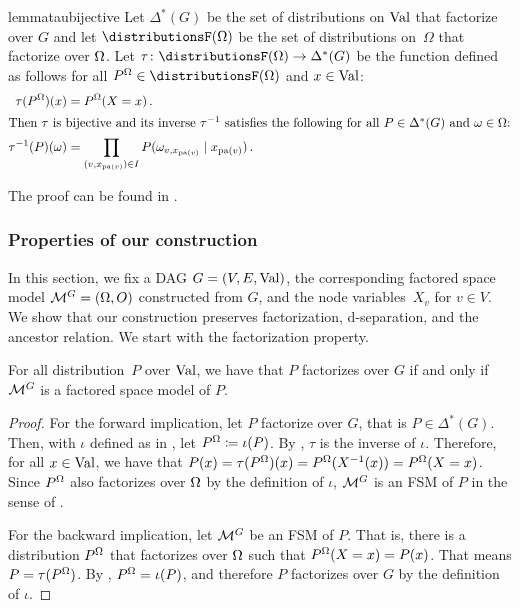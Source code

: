 \documentclass[USenglish,onecolumn]{article}
\begin{document}
\begin{restatable}{lemma}{taubijective}
    \label{lemma:taubijective}
Let $\Delta^*(G)$ be the set of distributions on $\textnormal{Val}$ that factorize over $G$ and let $\distributionsF(\Omg)$ be the set of distributions on~$\Omega$ that factorize over $\Omega$.
Let $\tau\colon\distributionsF(\Omg)\to \Delta^*(G)$ be the function defined as follows for all $P^\Omg\in \distributionsF(\Omg)$ and $x\in \textnormal{Val}$:
\begin{align*}
  \tau(P^\Omega)(x)
  &=P^\Omega(X=x)
  \,.\\
  \intertext{Then $\tau$ is bijective and its inverse $\tau^{-1}$ satisfies the following for all $P\in \Delta^*(G)$ and $\omega\in\Omega$:}
  \tau^{-1}(P)(\omega)
  &=
  \prod_{(v,x_{\text{pa}(v)})\in I} P(\omega_{v,x_{\text{pa}(v)}}\mid x_{\text{pa}(v)})\,.
\end{align*}
\end{restatable}
The proof can be found in .

\subsubsection{Properties of our construction}
In this section, we fix a DAG $G=(V,E,\textnormal{Val})$, the corresponding factored space model $\mathcal{M}^G=(\Omega, O)$ constructed from $G$, and the node variables~$X_v$ for $v\in V$.
We show that our construction preserves factorization, d-separation, and the ancestor relation.
We start with the factorization property.
\begin{proposition}
\label{prop:distributionconstruction}
    For all distribution~$P$ over $\textnormal{Val}$, we have that $P$ factorizes over $G$ if and only if $\mathcal{M}^G$ is a factored space model of $P$.
\end{proposition}

\begin{proof}
  For the forward implication, let $P$ factorize over $G$, that is $P\in \Delta^*(G)$. Then, with $\iota$ defined as in , let $P^\Omega\coloneq\iota(P)$. By , $\tau$ is the inverse of $\iota$. Therefore, for all $x\in \textnormal{Val}$, we have that $P(x)=\tau(P^\Omega)(x) = P^\Omega(X^{-1}(x)) =P^\Omega(X=x)$. Since $P^\Omega$ also factorizes over $\Omega$ by the definition of $\iota$,
$\mathcal{M}^G$ is an FSM of $P$ in the sense of .

For the backward implication, let $\mathcal{M}^G$ be an FSM of $P$. That is, there is a distribution $P^\Omega$ that factorizes over $\Omega$ such that $P^\Omega(X=x)=P(x)$. That means $P=\tau(P^\Omega)$. By , $P^\Omega=\iota(P)$, and therefore $P$ factorizes over $G$ by the definition of $\iota$.
\end{proof}
\end{document}
